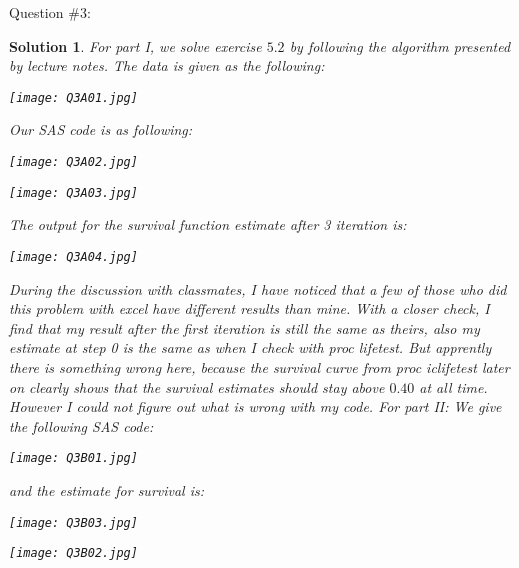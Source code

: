 \documentclass[11pt]{article}
\newtheorem{sol}{Solution}
\begin{document}
Question $\#3$:
\begin{sol}
	For part I, we solve exercise $5.2$ by following the algorithm presented by lecture notes.\vskip 2mm
	The data is given as the following:
	\begin{center}
		\texttt{[image: Q3A01.jpg]}
	\end{center}
	Our SAS code is as following:
	\begin{center}
		\texttt{[image: Q3A02.jpg]}
	\end{center}
	\begin{center}
		\texttt{[image: Q3A03.jpg]}
	\end{center}
	The output for the survival function estimate after 3 iteration is:
	\begin{center}
		\texttt{[image: Q3A04.jpg]}
	\end{center}
	During the discussion with classmates, I have noticed that a few of those who did this problem with excel have different results than mine. With a closer check, I find that my result after the first iteration is still the same as theirs, also my estimate at step 0 is the same as when I check with proc lifetest. But apprently there is something wrong here, because the survival curve from proc iclifetest later on clearly shows that the survival estimates should stay above $0.40$ at all time. However I could not figure out what is wrong with my code. \vskip 2mm
	For part II:\vskip 2mm
	We give the following SAS code:
	\begin{center}
		\texttt{[image: Q3B01.jpg]}
	\end{center}
	and the estimate for survival is:
	\begin{center}
		\texttt{[image: Q3B03.jpg]}
	\end{center}
	\begin{center}
		\texttt{[image: Q3B02.jpg]}
	\end{center}
\end{sol}
\end{document}
